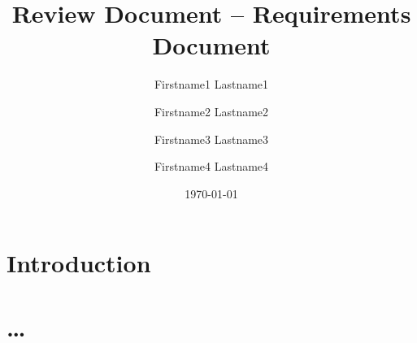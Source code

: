 \documentclass{article}
\title{Review Document -- Requirements Document}
\author{Firstname1 Lastname1 \and Firstname2 Lastname2 \and Firstname3
Lastname3 \and Firstname4 Lastname4}
\date{\today}
\begin{document}
\maketitle

\section{Introduction}
 
\section{\ldots}
 
\end{document}
